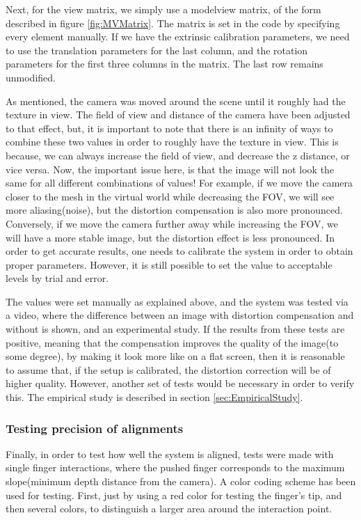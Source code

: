 \documentclass[]{article}
\begin{document}
Next, for the view matrix, we simply use a modelview matrix, of the form described in figure \ref{fig:MVMatrix}. The matrix is set in the code by specifying every element manually. If we have the extrinsic calibration parameters, we need to use the translation parameters for the last column, and the rotation parameters for the first three columns in the matrix. The last row remains unmodified.

As mentioned, the camera was moved around the scene until it roughly had the texture in view. The field of view and distance of the camera have been adjusted to that effect, but, it is important to note that there is an infinity of ways to combine these two values in order to roughly have the texture in view. This is because, we can always increase the field of view, and decrease the z distance, or vice versa. Now, the important issue here, is that the image will not look the same for all different combinations of values! For example, if we move the camera closer to the mesh in the virtual world while decreasing the FOV, we will see more aliasing(noise), but the distortion compensation is also more pronounced. Conversely, if we move the camera further away while increasing the FOV, we will have a more stable image, but the distortion effect is less pronounced. In order to get accurate results, one needs to calibrate the system in order to obtain proper parameters. However, it is still possible to set the value to acceptable levels by trial and error.

The values were set manually as explained above, and the system was tested via a video, where the difference between an image with distortion compensation and without is shown, and an experimental study. If the results from these tests are positive, meaning that the compensation improves the quality of the image(to some degree), by making it look more like on a flat screen, then it is reasonable to assume that, if the setup is calibrated, the distortion correction will be of higher quality. However, another set of tests would be necessary in order to verify this. The empirical study is described in section \ref{sec:EmpiricalStudy}.

\subsubsection{Testing precision of alignments}

Finally, in order to test how well the system is aligned, tests were made with single finger interactions, where the pushed finger corresponds to the maximum slope(minimum depth distance from the camera). A color coding scheme has been used for testing. First, just by using a red color for testing the finger's tip, and then several colors, to distinguish a larger area around the interaction point. 
\end{document}
